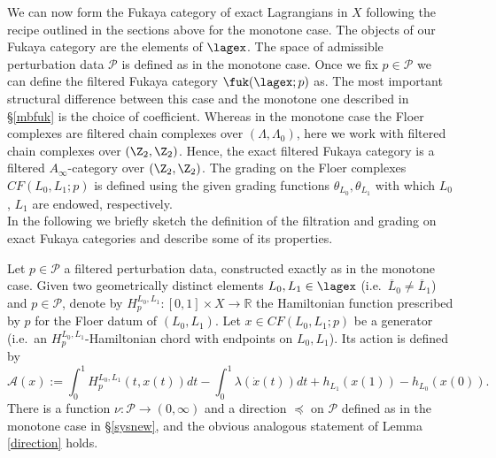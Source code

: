 We can now form the Fukaya category of exact Lagrangians in $X$ following the recipe outlined in the sections above for the monotone case. 
The objects of our Fukaya
category are the elements of $\lagex$.
The space of admissible
perturbation data $\mathcal{P}$ is defined as in the monotone case.
 Once we fix $p \in \mathcal{P}$ we can define
the filtered Fukaya category $\fuk(\lagex; p)$ as. 
The most important structural difference between this case and the monotone one described in \S \ref{mbfuk} is the choice of coefficient. Whereas in the monotone case the Floer complexes are filtered chain complexes over $(\Lambda,\Lambda_0)$, here we work with filtered chain complexes over $(\Z_2,\Z_2)$. Hence, the exact filtered Fukaya category is a filtered $A_\infty$-category over $(\Z_2,\Z_2)$. 
The grading on the Floer complexes
$CF(L_0, L_1; p)$ is defined using the given grading functions
$\theta_{L_0}, \theta_{L_1}$ with which $L_0$, $L_1$ are endowed,
respectively.\\

In the following we briefly sketch the definition of the filtration and grading on exact Fukaya categories and describe some of its properties.

Let $p\in \mathcal{P}$ a filtered perturbation data, constructed exactly as in the monotone case.
Given two geometrically distinct elements
$L_0, L_1 \in \lagex$ (i.e.~$\overline{L}_0 \neq \overline{L}_1$) and
$p \in \mathcal{P}$, denote by
$H^{L_0,L_1}_p: [0,1] \times X \longrightarrow \mathbb{R}$ the
Hamiltonian function prescribed by $p$ for the Floer datum of
$(L_0, L_1)$. Let $x \in CF(L_0, L_1; p)$ be a generator (i.e.~an
$H^{L_0,L_1}_p$-Hamiltonian chord with endpoints on $L_0, L_1$). Its
action is defined by
\begin{equation} \label{symp-act-1} \mathcal A(x) := \int_0^1
  H_p^{L_0,L_1}(t, x(t))dt - \int_0^1 \lambda(\dot{x}(t)) dt +
  h_{L_1}(x(1)) - h_{L_0}(x(0)).
\end{equation}
There is a function $\nu\colon \mathcal{P}\to (0,\infty)$ and a direction $\preceq$ on $\mathcal{P}$ defined as in the monotone case in \S\ref{sysnew}, and the obvious analogous statement of Lemma \ref{direction} holds.\\

